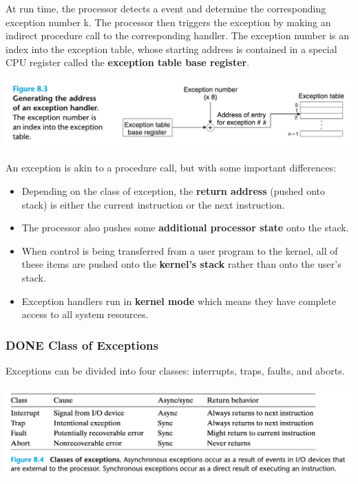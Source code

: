 \documentclass[11pt]{article}
\begin{document}
At run time, the processor detects a event and determine the corresponding exception number k. The processor then triggers the exception by making an indirect procedure call to the corresponding handler. The exception number is an index into the exception table, whose starting address is contained in a special CPU register called the \textbf{exception table base register}.\\

\begin{center}
\includegraphics[width=.9\linewidth]{pics/figure8.3-generating-the-address-of-an-exception-handler.png}
\end{center}


An exception is akin to a procedure call, but with some important differences:\\
\begin{itemize}
\item Depending on the class of exception, the \textbf{return address} (pushed onto stack) is either the current instruction or the next instruction.\\
\item The processor also pushes some \textbf{additional processor state} onto the stack.\\
\item When control is being transferred from a user program to the kernel, all of these items are pushed onto the \textbf{kernel’s stack} rather than onto the user’s stack.\\
\item Exception handlers run in \textbf{kernel mode} which means they have complete access to all system resources.\\
\end{itemize}


\subsubsection{{\bfseries\sffamily DONE} Class of Exceptions}
\label{sec:org6467e1d}
Exceptions can be divided into four classes: interrupts, traps, faults, and aborts.\\

\begin{center}
\includegraphics[width=.9\linewidth]{pics/figure8.4-classes-of-exceptions.png}
\end{center}
\end{document}
